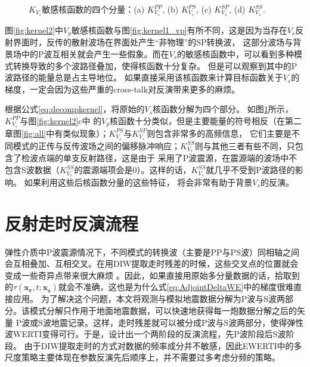 \begin{figure}[!htb]
   \caption{$K_{V_s}$敏感核函数的四个分量：(a) $K_{V_s}^{PP}$, (b) $K_{V_s}^{PS}$, (c) $K_{V_s}^{SP}$, (d) $K_{V_s}^{SS}$.}
   \label{fig:kernel2_vs_decomp}
\end{figure}
图\ref{fig:kernel2}中$V_p$敏感核函数与图\ref{fig:kernel1_vp}有所不同，这是因为当存在$V_s$反射界面时，反传的散射波场在界面处产生“非物理”的SP转换波，
这部分波场与背景场中的P波互相关就会产生一些假象。而在$V_s$的敏感核函数中，可以看到多种模式转换导致的多个波路径叠加，使得核函数十分复杂。
但是可以观察到其中的P波路径的能量总是占主导地位。
如果直接采用该核函数来计算目标函数关于$V_s$的梯度，一定会因为这些严重的cross-talk对反演带来更多的麻烦。

根据公式\eqref{eq:decompkernel}，将原始的$V_s$核函数分解为四个部分。
如图\ref{fig:kernel2_vs_decomp}所示，$K_{V_s}^{PP}$与图\ref{fig:kernel2}c中
的$V_p$核函数十分类似，但是主要能量的符号相反（在第二章图\ref{fig:all}中有类似现象）；$K_{V_s}^{PS}$与$K_{V_s}^{SP}$则包含非常多的高频信息，
它们主要是不同模式的正传与反传波场之间的偏移脉冲响应；$K_{V_s}^{SS}$则与其他三者有些不同，只包含了检波点端的单支反射路径，这是由于
采用了P波震源，在震源端的波场中不包含S波数据（$K_{V_s}^{SS}$的震源端项会是0）。这样的话，$K_{V_s}^{SS}$就几乎不受到P波路径的影响。
如果利用这些后核函数分量的这些特征，
将会非常有助于背景$V_s$的反演。
\section{反射走时反演流程}
弹性介质中P波震源情况下，不同模式的转换波（主要是PP与PS波）同相轴之间会互相叠加、互相交叉。在用DIW提取走时残差的时候，这些交叉点的位置就会变成一些奇异点带来很大麻烦
。因此，如果直接用原始多分量数据的话，拾取到的$\tau(\mathbf{x_r},t;\mathbf{x_s})$就会不准确，这也是为什么式\eqref{eq:AdjointDeltaWE}中的梯度很难直接应用。
为了解决这个问题，本文将观测与模拟地震数据分解为P波与S波两部分。该模式分解只作用于地面地震数据\cite[]{Li2016a}，可以快速地获得每一炮数据分解之后的矢量
P波或S波地震记录。这样，走时残差就可以被分成P波与S波两部分，使得弹性波WERTI变得可行。于是，设计出一个两阶段的反演流程，先P波阶段后S波阶段。
由于DIW提取走时的方式对数据的频率成分并不敏感，因此EWERTI中的多尺度策略主要体现在参数反演先后顺序上，并不需要过多考虑分频的策略。

